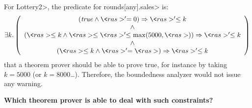 For \<Lottery2>, the predicate for \<rounds[any].sales> is:
%
\[
  \exists k.\left(\begin{array}{c}
    (\mathit{true}\wedge\<ras>'=0)\Rightarrow\<ras>'\le k\\
    \wedge\\
    (\<ras>\le k\wedge\<ras>\le\<ras>'\le\max(5000,\<ras>))\Rightarrow\<ras>'\le k\\
    \wedge\\
    (\<ras>\le k\wedge\<ras>'=\<ras>)\Rightarrow\<ras>'\le k
  \end{array}\right)
\]
%
that a theorem prover should be able to prove true, for instance by taking
$k=5000$ (or $k=8000$\ldots). Therefore, the boundedness analyzer would not
issue any warning.

\textbf{Which theorem prover is able to deal with such constraints?}
